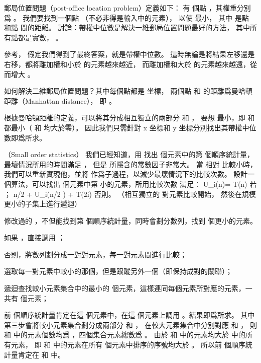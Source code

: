 郵局位置問題（post-office location problem）定義如下：
有  個點 ，其權重分別爲 。
我們要找到一個點  （不必非得是輸入中的元素），
以使  最小，
其中  是點  和點  間的距離。
\startigBase[a,continue]
\startitem
討論：帶權中位數是解決一維郵局位置問題最好的方法，
其中所有點都是實數， 。
\stopitem

\startANSWER
參考，
假定我們得到了最終答案，就是帶權中位數。
這時無論是將結果左移還是右移，都將離加權和小於  的元素越來越近，
而離加權和大於  的元素越來越遠，從而增大 。
\stopANSWER

\startitem
如何解決二維郵局位置問題？其中每個點都是  坐標，
兩個點  和  的距離爲{\EMP 曼哈頓距離（Manhattan distance）}，
即 。
\stopitem

\startANSWER
根據曼哈頓距離的定義，可以將其分成相互獨立的兩部分  和 ，
要想  最小，即  和  都最小（ 和  均大於零）。
因此我們只需針對 x 坐標和 y 坐標分別找出其帶權中位數即爲所求。
\stopANSWER
\stopigBase

\stopPROBLEM

\startPROBLEM
（Small order statistics）
我們已經知道，用  找出  個元素中的第  個順序統計量，
最壞情況所用的時間滿足 ，
但是 \m{\Theta} 所隱含的常數因子非常大。
當  相對  比較小時，
我們可以重新實現他，並將  作爲子過程，以減少最壞情況下的比較次數。
\startigBase[a]
\startitem
設計一個算法，可以找出  個元素中第  小的元素，所用比較次數  滿足：
\startformula
U_i(n)=\startmathcases
\NC T(n) \NC 若 ； \NR
\NC \lfloor n/2 \rfloor + U_i(\lceil n/2 \rceil) + T(2i) \NC 否則。 \NR
\stopmathcases
\stopformula
（\hint 相互獨立的 對元素比較開始，
然後在規模更小的子集上進行遞迴）
\stopitem

\startANSWER
修改過的 ，不但能找到第  個順序統計量，同時會劃分數列，找到  個更小的元素。
\startigNum
\item 如果 ，直接調用 ；
\item 否則，將數列劃分成一對對元素，每一對元素間進行比較；
\item 選取每一對元素中較小的那個，但是跟蹤另外一個（即保持成對的關聯）；
\item 遞迴查找較小元素集合中的最小的  個元素，這樣連同每個元素所對應的元素，一共有  個元素；
\item 前  個順序統計量肯定在這  個元素中，在這  個元素上調用 。結果即爲所求。
\stopigNum
其中第三步會將較小元素集合劃分成兩部分  和 ，
在較大元素集合中分別對應  和 ，
則  和  中的元素個數均爲 ，四個集合元素總數爲 。
由於  和  中的元素均大於  中的所有元素，
即  和  中的元素在所有  個元素中排序的序號均大於 。
所以前  個順序統計量肯定在  和  中。
\stopANSWER

